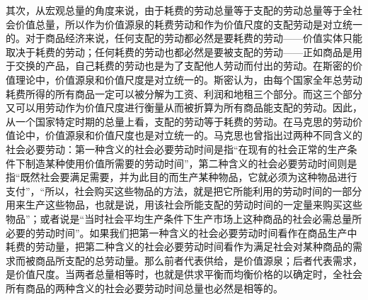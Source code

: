 其次，从宏观总量的角度来说，由于耗费的劳动总量等于支配的劳动总量等于全社会价值总量\cite[71-72]{CaiJiMingLunHaoFeiDeLaoDongYuGouMaiDeLaoDongZaiJieZhiLiLunZhongDeZuoYong2022}，所以作为价值源泉的耗费劳动和作为价值尺度的支配劳动是对立统一的。对于商品经济来说，任何支配的劳动都必然是要耗费的劳动——价值实体只能取决于耗费的劳动；任何耗费的劳动也都必然是要被支配的劳动——正如商品是用于交换的产品，自己耗费的劳动也是为了支配他人劳动而付出的劳动。在斯密的价值理论中，价值源泉和价值尺度是对立统一的。斯密认为，由每个国家全年总劳动耗费所得的所有商品一定可以被分解为工资、利润和地租三个部分。而这三个部分又可以用劳动作为价值尺度进行衡量从而被折算为所有商品能支配的劳动。因此，从一个国家特定时期的总量上看，支配的劳动等于耗费的劳动。\cite[41-48]{YaDang*SiMiGuoFuLun2015}在马克思的劳动价值论中，价值源泉和价值尺度也是对立统一的。马克思也曾指出过两种不同含义的社会必要劳动\cite[29]{CaiJiMingBiYaoLaoDongIHeBiYaoLaoDongIIGongTongJueDingJieZhi1995}\cite[19]{GuShuTangDuiJieZhiJueDingHeJieZhiGuiLuDeZaiTanTao1982}：第一种含义的社会必要劳动时间是指“在现有的社会正常的生产条件下制造某种使用价值所需要的劳动时间”\cite[52]{ZhongGongZhongYangMaKeSiEnGeSiLieNingSiDaLinZhuZuoBianYiJuMaKeSiEnGeSiWenJiDi5Juan2009}，第二种含义的社会必要劳动时间则是指“既然社会要满足需要，并为此目的而生产某种物品，它就必须为这种物品进行支付”，“所以，社会购买这些物品的方法，就是把它所能利用的劳动时间的一部分用来生产这些物品，也就是说，用该社会所能支配的劳动时间的一定量来购买这些物品”\cite[208]{ZhongGongZhongYangMaKeSiEnGeSiLieNingSiDaLinZhuZuoBianYiJuMaKeSiEnGeSiWenJiDi7Juan2009}；或者说是“当时社会平均生产条件下生产市场上这种商品的社会必需总量所必要的劳动时间”\cite[722]{ZhongGongZhongYangMaKeSiEnGeSiLieNingSiDaLinZhuZuoBianYiJuMaKeSiEnGeSiWenJiDi7Juan2009}。如果我们把第一种含义的社会必要劳动时间看作在商品生产中耗费的劳动量，把第二种含义的社会必要劳动时间看作为满足社会对某种商品的需求而被商品所支配的总劳动量。那么前者代表供给，是价值源泉；后者代表需求，是价值尺度。当两者总量相等时，也就是供求平衡而均衡价格的以确定时，全社会所有商品的两种含义的社会必要劳动时间总量也必然是相等的\cite[72]{CaiJiMingLunHaoFeiDeLaoDongYuGouMaiDeLaoDongZaiJieZhiLiLunZhongDeZuoYong2022}。